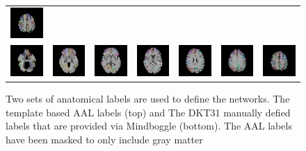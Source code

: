 \documentclass{frontiersSCNS} %
\begin{document}
\begin{figure}
\begin{center}
\begin{tabular}{ccccccc}
\includegraphics[width=0.14\linewidth]{figures/aal_185_masked.png} \\
\includegraphics[width=0.14\linewidth]{figures/dkt_125_masked.png} & 
\includegraphics[width=0.14\linewidth]{figures/dkt_135_masked.png} & 
\includegraphics[width=0.14\linewidth]{figures/dkt_145_masked.png} & 
\includegraphics[width=0.14\linewidth]{figures/dkt_155_masked.png} & 
\includegraphics[width=0.14\linewidth]{figures/dkt_165_masked.png} & 
\includegraphics[width=0.14\linewidth]{figures/dkt_175_masked.png} & 
\includegraphics[width=0.14\linewidth]{figures/dkt_185_masked.png}
\end{tabular}
\caption{Two sets of anatomical labels are used to define the
  networks. The template based AAL labels (top) and The DKT31 manually
  defied labels that are provided via Mindboggle (bottom). The AAL
  labels have been masked to only include gray matter}
\label{fig:labels}
\end{center}
\end{figure}
\end{document}
